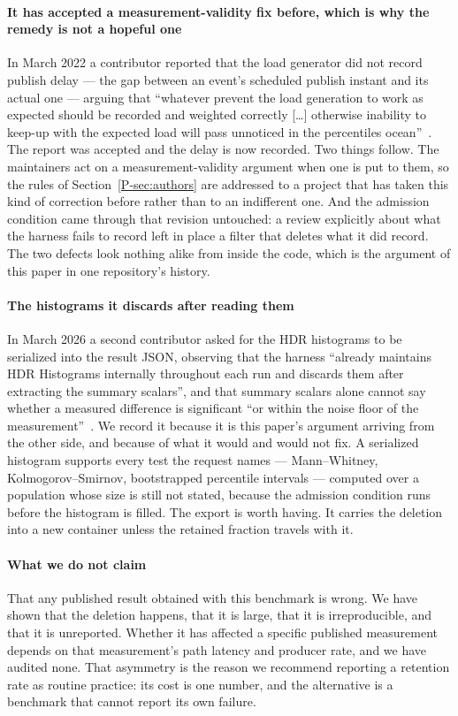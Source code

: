 \documentclass[10pt,journal,onecolumn]{IEEEtran}
\newcommand{\mainAuthors}{\ref{P-sec:authors}}        %
\begin{document}
\paragraph{It has accepted a measurement-validity fix before, which is why the remedy is
not a hopeful one} In March 2022 a contributor reported that the load generator did not
record publish delay --- the gap between an event's scheduled publish instant and its actual
one --- arguing that ``whatever prevent the load generation to work as expected should be
recorded and weighted correctly [\ldots] otherwise inability to keep-up with the expected
load will pass unnoticed in the percentiles ocean''~\cite{omb2022coordinated}. The report
was accepted and the delay is now recorded. Two things follow. The maintainers act on a
measurement-validity argument when one is put to them, so the rules of
Section~\mainAuthors{} are addressed to a project that has taken this kind of correction
before rather than to an indifferent one. And the admission condition came through that
revision untouched: a review explicitly about what the harness fails to record left in
place a filter that deletes what it did record. The two defects look nothing alike from
inside the code, which is the argument of this paper in one repository's history.

\paragraph{The histograms it discards after reading them} In March 2026 a second
contributor asked for the HDR histograms to be serialized into the result JSON, observing
that the harness ``already maintains HDR Histograms internally throughout each run and
discards them after extracting the summary scalars'', and that summary scalars alone
cannot say whether a measured difference is significant ``or within the noise floor of the
measurement''~\cite{omb2026histogram}. We record it because it is this paper's argument
arriving from the other side, and because of what it would and would not fix. A serialized
histogram supports every test the request names --- Mann--Whitney, Kolmogorov--Smirnov,
bootstrapped percentile intervals --- computed over a population whose size is still not
stated, because the admission condition runs before the histogram is filled. The export is
worth having. It carries the deletion into a new container unless the retained fraction
travels with it.

\paragraph{What we do not claim} That any published result obtained with this benchmark is wrong.
We have shown that the deletion happens, that it is large, that it is irreproducible, and that it
is unreported. Whether it has affected a specific published measurement depends on that
measurement's path latency and producer rate, and we have audited none. That asymmetry is the
reason we recommend reporting a retention rate as routine practice: its cost is one number, and
the alternative is a benchmark that cannot report its own failure.
\end{document}
